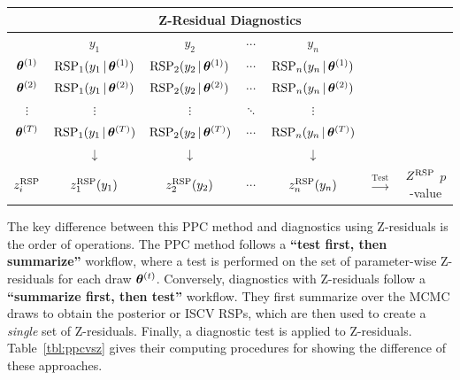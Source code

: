 \begin{table}[htp]
{\begin{tabular}{c|ccccrc}
    \multicolumn{7}{c}{\bf Z-Residual Diagnostics} \\
    \hline
     & $y_1$ & $y_2$ & $\cdots$ & $y_n$ & &  \\
    \hline
    $\bm{\theta}^{(1)}$ & $\text{RSP}_1(y_1 \,|\, \bm{\theta}^{(1)})$ & $\text{RSP}_2(y_2 \,|\, \bm{\theta}^{(1)})$ & $\cdots$ & $\text{RSP}_n(y_n \,|\, \bm{\theta}^{(1)})$ & & \\
    $\bm{\theta}^{(2)}$ & $\text{RSP}_1(y_1 \,|\, \bm{\theta}^{(2)})$ & $\text{RSP}_2(y_2 \,|\, \bm{\theta}^{(2)})$ & $\cdots$ & $\text{RSP}_n(y_n \,|\, \bm{\theta}^{(2)})$ & & \\
    $\vdots$ & $\vdots$ & $\vdots$ & $\ddots$ & $\vdots$ & & \\
    $\bm{\theta}^{(T)}$ & $\text{RSP}_1(y_1 \,|\, \bm{\theta}^{(T)})$ & $\text{RSP}_2(y_2 \,|\, \bm{\theta}^{(T)})$ & $\cdots$ & $\text{RSP}_n(y_n \,|\, \bm{\theta}^{(T)})$ & & \\
    \hline
     & $\downarrow$ & $\downarrow$ & & $\downarrow$ & & \\
    $z_i^{\text{RSP}}$ & $z^{\text{RSP}}_1(y_1)$ & $z^{\text{RSP}}_2(y_2)$ & $\cdots$ & $z^{\text{RSP}}_n(y_n)$ & $\xrightarrow{\text{Test}}$ & ${Z^{\text{RSP}}}$ $p$-value  \\
    \hline
    \end{tabular}
}

\end{table}


The key difference between this PPC method and diagnostics using Z-residuals is the order of operations. The PPC method follows a \textbf{``test first, then summarize''} workflow, where a test is performed on the set of parameter-wise Z-residuals for each draw $\bm{\theta}^{(t)}$. Conversely, diagnostics with Z-residuals follow a \textbf{``summarize first, then test''} workflow. They first summarize over the MCMC draws to obtain the posterior or ISCV RSPs, which are then used to create a \textit{single} set of Z-residuals. Finally, a diagnostic test is applied to Z-residuals. Table~\ref{tbl:ppcvsz} gives their computing procedures for showing the difference of these approaches.


\subsection{ }\label{sec:asympZvsPPC}



